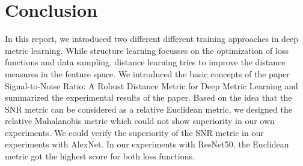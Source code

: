 \documentclass[12pt,paper=a4]{scrartcl}
\theoremstyle{break}
\begin{document}
\section{Conclusion}
In this report, we introduced two different different training approaches in deep metric learning. While structure learning focusses on the optimization of loss functions and data sampling, distance learning tries to improve the distance measures in the feature space. We introduced the basic concepts of the paper \dq Signal-to-Noise Ratio: A Robust Distance Metric for Deep Metric Learning\dq \cite{source1} and  summarized the experimental results of the paper. Based on the idea that the SNR metric can be considered as a relative Euclidean metric, we designed the relative Mahalanobis metric which could not show superiority in our own experiments. We could verify the superiority of the SNR metric in our experiments with AlexNet. In our experiments with ResNet50, the Euclidean metric got the highest score for both loss functions.
\clearpage
\end{document}
